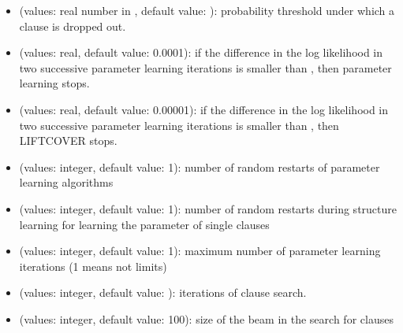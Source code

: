 \documentclass[letterpaper,10pt,english]{sphinxmanual}
\begin{document}
\begin{itemize}
\item {} 
\sphinxAtStartPar
{} (values: real number in \sphinxcode{\sphinxupquote{{[}0,1{]}}}, default value: ):  probability threshold under which a clause is dropped out.

\item {} 
\sphinxAtStartPar
{} (values: real, default value: 0.0001): if the difference in the log likelihood in two successive parameter learning iterations is smaller than , then parameter learning stops.

\item {} 
\sphinxAtStartPar
{} (values: real, default value: 0.00001): if the difference in the log likelihood in two successive parameter learning iterations is smaller than , then LIFTCOVER stops.

\item {} 
\sphinxAtStartPar
{} (values: integer, default value: 1): number of random restarts of parameter learning algorithms

\item {} 
\sphinxAtStartPar
{} (values: integer, default value: 1): number of random restarts during structure learning for learning the parameter of single clauses

\item {} 
\sphinxAtStartPar
{} (values: integer, default value: \sphinxhyphen{}1): maximum number of parameter learning iterations (\sphinxhyphen{}1 means not limits)

\item {} 
\sphinxAtStartPar
{} (values: integer, default value: ): iterations of clause search.

\item {} 
\sphinxAtStartPar
{} (values: integer, default value: 100): size of the beam in the search for clauses


\end{itemize}
\end{document}
